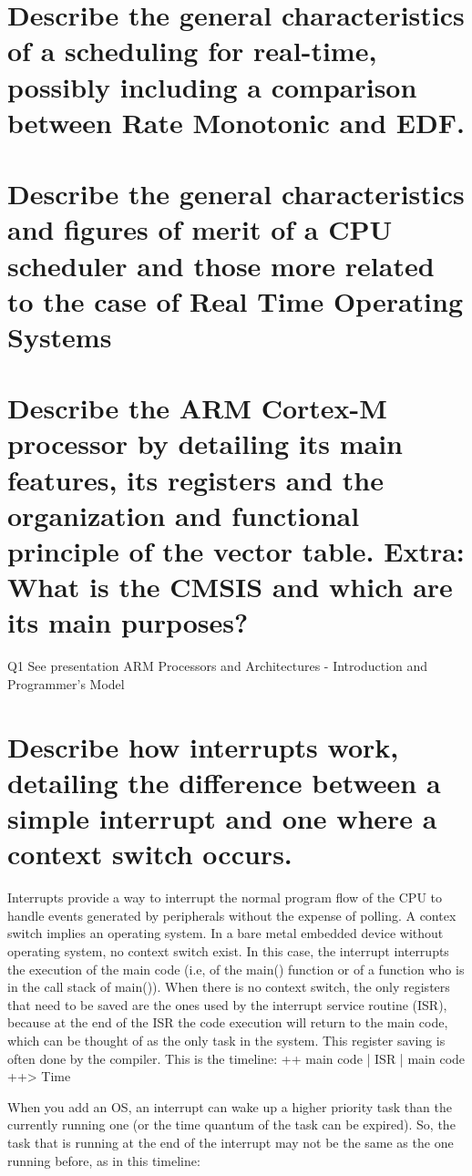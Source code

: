 \section{Describe the general characteristics of a scheduling for real-time, possibly including a comparison between Rate Monotonic and EDF. }



\section{Describe the general characteristics and figures of merit of a CPU scheduler and those more related to the case of Real Time Operating Systems}


\section{Describe the ARM Cortex-M processor by detailing its main features, its registers and the organization and functional principle of the vector table. Extra: What is the CMSIS and which are its main purposes?  }

Q1 See presentation ARM Processors and Architectures - Introduction and Programmer's Model

\section{Describe how interrupts work, detailing the difference between a simple interrupt and one where a context switch occurs.}
Interrupts provide a way to interrupt the normal program flow of the CPU  to handle events generated by peripherals without the expense of polling. A contex switch implies an operating system. In a bare metal embedded device without operating system, no context switch exist. In this case, the interrupt interrupts the execution of the main code (i.e, of the main() function or of a function who is in the call stack of main()). When there is no context switch, the only registers that need to be saved are the ones used by the interrupt service routine (ISR), because at the end of the ISR the code execution will return to the main code, which can be thought of as the only task in the system. This register saving is often done by the compiler. 
This is the timeline:  
++ main code | ISR | main code ++> Time

When you add an OS, an interrupt can wake up a higher priority task than the currently running one (or the time quantum of the task can be expired). So, the task that is running at the end of the interrupt may not be the same as the one running before, as in this timeline: 


